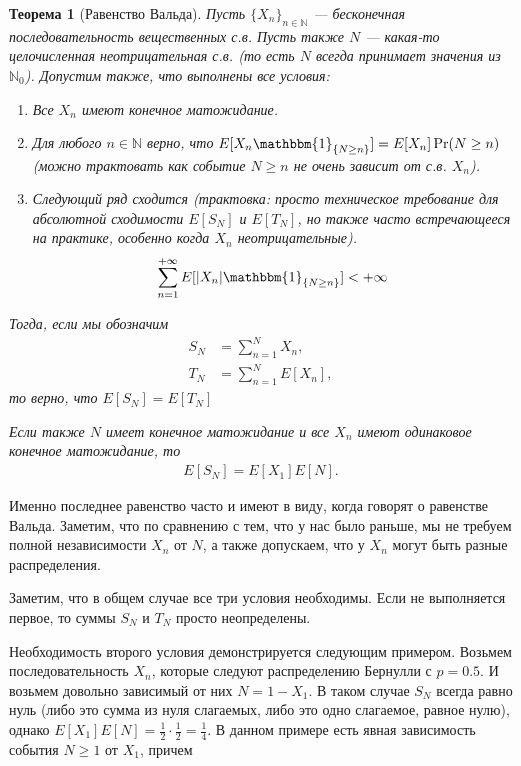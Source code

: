 \documentclass[12pt]{article}
\newcommand\N{\mathbb{N}}
\newcommand\one{\mathbbm{1}}
\newtheorem{theorem}{Теорема}
\begin{document}
\begin{theorem}[Равенство Вальда]
  Пусть $\{X_n\}_{n \in \N}$ --- бесконечная последовательность вещественных с.в. Пусть также $N$ --- какая-то целочисленная неотрицательная с.в. (то есть $N$ всегда принимает значения из $\N_0$). Допустим также, что выполнены все условия:
  \begin{enumerate}
    \item Все $X_n$ имеют конечное матожидание.
    \item Для любого $n \in \N$ верно, что $E[X_n \one_{\{N \ge n\}}] = E[X_n] \Pr(N \ge n)$ (можно трактовать как событие $N \ge n$ не очень зависит от с.в. $X_n$).
    \item Следующий ряд сходится (трактовка: просто техническое требование для абсолютной сходимости $E[S_N]$ и $E[T_N]$, но также часто встречающееся на практике, особенно когда $X_n$ неотрицательные).
    \begin{align*}
      \sum_{n = 1}^{+\infty} E[|X_n|\one_{\{N \ge n\}}] < +\infty
    \end{align*}
  \end{enumerate}
  Тогда, если мы обозначим 
  \begin{align*}
    S_N &= \sum_{n = 1}^N X_n, \\
    T_N &= \sum_{n = 1}^N E[X_n],
  \end{align*}
  то верно, что $E[S_N] = E[T_N]$
  
  Если также $N$ имеет конечное матожидание и все $X_n$ имеют одинаковое конечное матожидание, то
  \begin{align*}
    E[S_N] = E[X_1] E[N].
  \end{align*}
\end{theorem}

Именно последнее равенство часто и имеют в виду, когда говорят о равенстве Вальда. Заметим, что по сравнению с тем, что у нас было раньше, мы не требуем полной независимости $X_n$ от $N$, а также допускаем, что у $X_n$ могут быть разные распределения.

Заметим, что в общем случае все три условия необходимы. Если не выполняется первое, то суммы $S_N$ и $T_N$ просто неопределены. 

Необходимость второго условия демонстрируется следующим примером. Возьмем последовательность $X_n$, которые следуют распределению Бернулли с $p = 0.5$. И возьмем довольно зависимый от них $N = 1 - X_1$. В таком случае $S_N$ всегда равно нуль (либо это сумма из нуля слагаемых, либо это одно слагаемое, равное нулю), однако $E[X_1]E[N] = \frac{1}{2} \cdot \frac{1}{2} = \frac{1}{4}$. В данном примере есть явная зависимость события $N \ge 1$ от $X_1$, причем 
\end{document}
